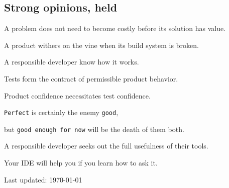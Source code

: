 \documentclass[10pt,letterpaper]{article}
\newcommand\ttt\texttt
\renewenvironment{itemize}{
  \begin{list}{}{
    \setlength{\leftmargin}{1.5em}
    \setlength{\itemsep}{0.25em}
    \setlength{\parskip}{0pt}
    \setlength{\parsep}{0.25em}
  }
}{
  \end{list}
}
\begin{document}
\newcommand{\opinionsPar}{\par\vspace{-.3em}\quad}
\newcommand{\gah}[1]{\ttt{#1}}
\subsection*{Strong opinions, held}
\begin{itemize}
  \item A problem does not need to become costly before its solution has value.
  \item A product withers on the vine when its build system is broken.\opinionsPar
    A responsible developer know how it works.
  \item Tests form the contract of permissible product behavior.\opinionsPar
    Product confidence necessitates test confidence.
  \item \gah{Perfect} is certainly the enemy \gah{good},\opinionsPar
    but \gah{good enough for now} will be the death of them both.
  \item A responsible developer seeks out the full usefulness of their tools.\opinionsPar
    Your IDE will help you if you learn how to ask it.
\end{itemize}

%

\vfill
\begin{center}
  \begin{small}
    Last updated: \today
  \end{small}
\end{center}
\end{document}

